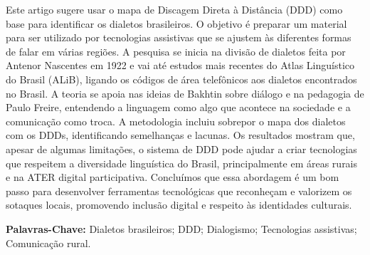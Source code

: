 	\begin{resumo}

Este artigo sugere usar o mapa de Discagem Direta à Distância (DDD) como base para identificar os dialetos brasileiros. O objetivo é preparar um material para ser utilizado por tecnologias assistivas que se ajustem às diferentes formas de falar em várias regiões. A pesquisa se inicia na divisão de dialetos feita por Antenor Nascentes em 1922 e vai até estudos mais recentes do Atlas Linguístico do Brasil (ALiB), ligando os códigos de área telefônicos aos dialetos encontrados no Brasil. A teoria se apoia nas ideias de Bakhtin sobre diálogo e na pedagogia de Paulo Freire, entendendo a linguagem como algo que acontece na sociedade e a comunicação como troca. A metodologia incluiu sobrepor o mapa dos dialetos com os DDDs, identificando semelhanças e lacunas. Os resultados mostram que, apesar de algumas limitações, o sistema de DDD pode ajudar a criar tecnologias que respeitem a diversidade linguística do Brasil, principalmente em áreas rurais e na ATER digital participativa. Concluímos que essa abordagem é um bom passo para desenvolver ferramentas tecnológicas que reconheçam e valorizem os sotaques locais, promovendo inclusão digital e respeito às identidades culturais.
\\[0.5em]

		
		\vspace*{0.5cm}
		
		\noindent\textbf{{Palavras-Chave: }}  Dialetos brasileiros; DDD; Dialogismo; Tecnologias assistivas; Comunicação rural.

		
	\end{resumo}
	
	

